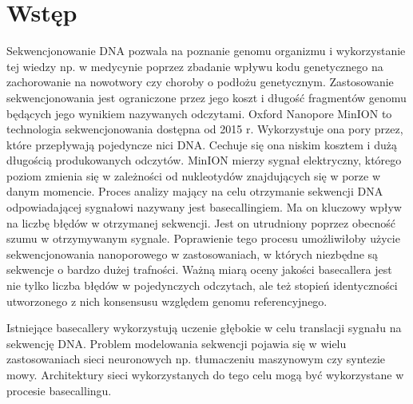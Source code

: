 \documentclass[a4paper,11pt,twoside]{report}
\theoremstyle{definition}
\begin{document}
\thispagestyle{empty}
\newpage

\null\thispagestyle{empty}\newpage


\tableofcontents
\thispagestyle{empty}

\newpage %
\null\newpage
\null\thispagestyle{empty}\newpage
\pagestyle{fancy}
\setcounter{page}{12} %

\chapter{Wstęp}
Sekwencjonowanie DNA pozwala na poznanie genomu organizmu i wykorzystanie tej wiedzy np. w medycynie poprzez zbadanie wpływu kodu genetycznego na zachorowanie na nowotwory \cite{cancerNonCoding} czy choroby o podłożu genetycznym\cite{diagnosis}. Zastosowanie sekwencjonowania jest ograniczone przez jego koszt i długość fragmentów genomu będących jego wynikiem nazywanych odczytami. Oxford Nanopore MinION to technologia sekwencjonowania dostępna od 2015 r. Wykorzystuje ona pory przez, które przepływają pojedyncze nici DNA. Cechuje się ona niskim kosztem i dużą długością produkowanych odczytów. MinION mierzy sygnał elektryczny, którego poziom zmienia się w zależności od nukleotydów znajdujących się w porze  w danym momencie. Proces analizy mający na celu otrzymanie sekwencji DNA odpowiadającej sygnałowi nazywany jest basecallingiem. Ma on kluczowy wpływ na liczbę błędów  w otrzymanej sekwencji. Jest on utrudniony poprzez obecność szumu w otrzymywanym sygnale. Poprawienie tego procesu umożliwiłoby użycie sekwencjonowania nanoporowego w zastosowaniach, w których niezbędne są sekwencje o bardzo dużej trafności\cite{snp}. Ważną miarą oceny jakości basecallera jest nie tylko liczba błędów w pojedynczych odczytach, ale też stopień identyczności utworzonego z nich konsensusu względem genomu referencyjnego.

Istniejące basecallery wykorzystują uczenie głębokie w celu translacji sygnału na sekwencję DNA. Problem modelowania sekwencji pojawia się w wielu zastosowaniach sieci neuronowych np. tłumaczeniu maszynowym czy syntezie mowy. Architektury sieci wykorzystanych do tego celu mogą być wykorzystane w procesie basecallingu.
\end{document}
